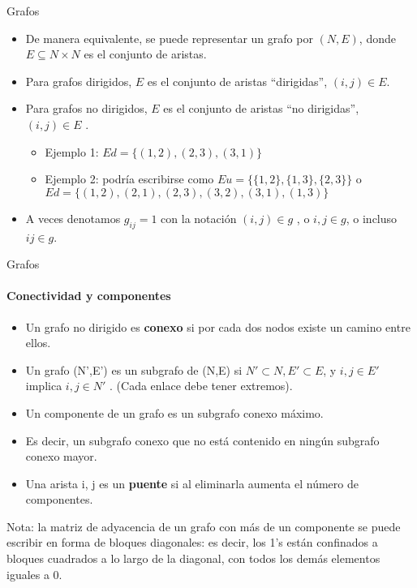 \documentclass[11pt]{beamer}
\begin{document}
\begin{frame}{Grafos}
 \begin{itemize}
     \item De manera equivalente, se puede representar un grafo por $(N, E )$, donde $E \subseteq N \times N$ es el conjunto de aristas.
\item Para grafos dirigidos, $E$ es el conjunto de aristas “dirigidas”, $(i, j ) \in E $.
\item Para grafos no dirigidos, $E$ es el conjunto de aristas “no dirigidas”,  $(i, j ) \in E $ .
\begin{itemize}
    \item Ejemplo 1: $Ed = \{(1, 2) , (2, 3) , (3, 1)\}$
    \item Ejemplo 2: podría escribirse como $Eu = \{\{1,2\}, \{1,3\}, \{2,3\}\}$ o $Ed = \{(1,2), (2,1), (2,3), (3,2), (3,1), (1,3)\}$
\end{itemize}
\item A veces denotamos $g_{ij} = 1$ con la notación $(i, j ) \in g$ , o ${i, j } \in g $, o incluso $ij \in g $.
 \end{itemize}   
\end{frame}

\begin{frame}{Grafos}
    \framesubtitle{Conectividad y componentes}
 \begin{itemize}
     \item Un grafo no dirigido es \textbf{conexo} si por cada dos nodos existe un camino entre ellos.
\item Un grafo (N',E') es un subgrafo de (N,E) si $N' \subset N, E' \subset E$, y ${i, j } \in E'$ implica $i, j \in N'$ . (Cada enlace debe tener extremos).
\item Un componente de un grafo es un subgrafo conexo máximo.
\item  Es decir, un subgrafo conexo que no está contenido en ningún subgrafo conexo mayor.
\item Una arista {i, j } es un \textbf{puente} si al eliminarla aumenta el número de componentes.
 \end{itemize}   
 Nota: la matriz de adyacencia de un grafo con más de un componente se puede escribir en forma de bloques diagonales: es decir, los 1's están confinados a bloques cuadrados a lo largo de la diagonal, con todos los demás elementos iguales a 0.
\end{frame}
\end{document}
